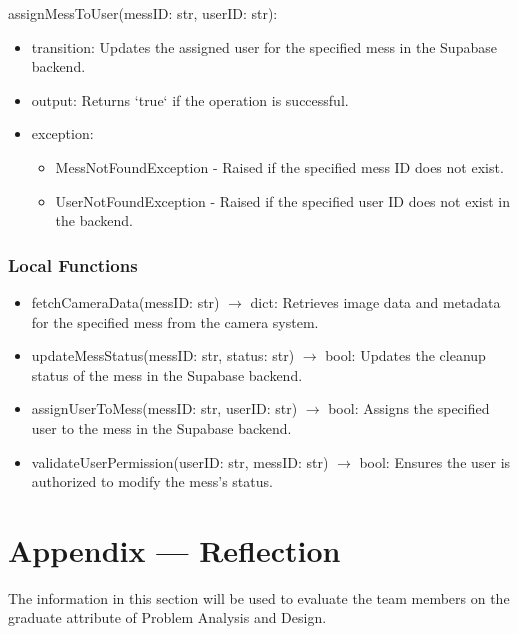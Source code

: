 \documentclass[12pt, titlepage]{article}
\begin{document}
\noindent assignMessToUser(messID: str, userID: str):
\begin{itemize}
\item transition: Updates the assigned user for the specified mess in the Supabase backend.
\item output: Returns `true` if the operation is successful.
\item exception: 
  \begin{itemize}
    \item MessNotFoundException - Raised if the specified mess ID does not exist.
    \item UserNotFoundException - Raised if the specified user ID does not exist in the backend.
  \end{itemize}
\end{itemize}

\subsubsection{Local Functions}

\begin{itemize}
  \item fetchCameraData(messID: str) $\rightarrow$ dict: Retrieves image data and metadata for the specified mess from the camera system.
  \item updateMessStatus(messID: str, status: str) $\rightarrow$ bool: Updates the cleanup status of the mess in the Supabase backend.
  \item assignUserToMess(messID: str, userID: str) $\rightarrow$ bool: Assigns the specified user to the mess in the Supabase backend.
  \item validateUserPermission(userID: str, messID: str) $\rightarrow$ bool: Ensures the user is authorized to modify the mess's status.
\end{itemize}

\newpage{}

\section*{Appendix --- Reflection}

The information in this section will be used to evaluate the team members on the
graduate attribute of Problem Analysis and Design.


\end{document}
